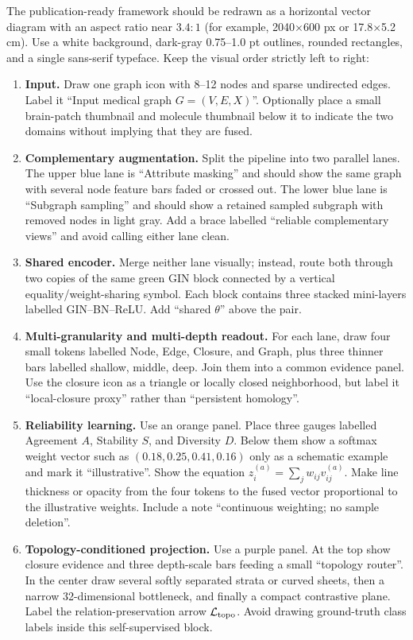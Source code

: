 \documentclass[10pt,twocolumn]{article}
\begin{document}
The publication-ready framework should be redrawn as a horizontal vector diagram with an aspect ratio near $3.4{:}1$ (for example, 2040$\times$600 px or 17.8$\times$5.2 cm). Use a white background, dark-gray 0.75--1.0 pt outlines, rounded rectangles, and a single sans-serif typeface. Keep the visual order strictly left to right:

\begin{enumerate}[leftmargin=*]
    \item \textbf{Input.} Draw one graph icon with 8--12 nodes and sparse undirected edges. Label it ``Input medical graph $G=(V,E,X)$''. Optionally place a small brain-patch thumbnail and molecule thumbnail below it to indicate the two domains without implying that they are fused.
    \item \textbf{Complementary augmentation.} Split the pipeline into two parallel lanes. The upper blue lane is ``Attribute masking'' and should show the same graph with several node feature bars faded or crossed out. The lower blue lane is ``Subgraph sampling'' and should show a retained sampled subgraph with removed nodes in light gray. Add a brace labelled ``reliable complementary views'' and avoid calling either lane clean.
    \item \textbf{Shared encoder.} Merge neither lane visually; instead, route both through two copies of the same green GIN block connected by a vertical equality/weight-sharing symbol. Each block contains three stacked mini-layers labelled GIN--BN--ReLU. Add ``shared $\theta$'' above the pair.
    \item \textbf{Multi-granularity and multi-depth readout.} For each lane, draw four small tokens labelled Node, Edge, Closure, and Graph, plus three thinner bars labelled shallow, middle, deep. Join them into a common evidence panel. Use the closure icon as a triangle or locally closed neighborhood, but label it ``local-closure proxy'' rather than ``persistent homology''.
    \item \textbf{Reliability learning.} Use an orange panel. Place three gauges labelled Agreement $A$, Stability $S$, and Diversity $D$. Below them show a softmax weight vector such as $(0.18,0.25,0.41,0.16)$ only as a schematic example and mark it ``illustrative''. Show the equation $z_i^{(a)}=\sum_jw_{ij}v_{ij}^{(a)}$. Make line thickness or opacity from the four tokens to the fused vector proportional to the illustrative weights. Include a note ``continuous weighting; no sample deletion''.
    \item \textbf{Topology-conditioned projection.} Use a purple panel. At the top show closure evidence and three depth-scale bars feeding a small ``topology router''. In the center draw several softly separated strata or curved sheets, then a narrow 32-dimensional bottleneck, and finally a compact contrastive plane. Label the relation-preservation arrow $\mathcal L_{\rm topo}$. Avoid drawing ground-truth class labels inside this self-supervised block.

\end{enumerate}
\end{document}
